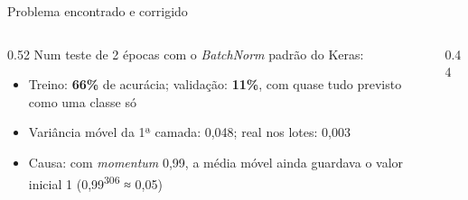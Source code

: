 \documentclass[aspectratio=169,10pt,t]{beamer}
\begin{document}
\begin{frame}{Problema encontrado e corrigido}
\begin{columns}[T]
\begin{column}{0.52\textwidth}
Num teste de 2 épocas com o \textit{BatchNorm} padrão do Keras:
\begin{itemize}
\item Treino: \textbf{66\%} de acurácia; validação: \textbf{11\%}, com quase tudo previsto como uma classe só
\item Variância móvel da 1ª camada: 0,048; real nos lotes: 0,003
\item Causa: com \textit{momentum} 0,99, a média móvel ainda guardava o valor inicial 1 (0,99\textsuperscript{306} ≈ 0,05)
\end{itemize}
\end{column}
\begin{column}{0.44\textwidth}
\vskip3mm
\end{column}
\end{columns}
\end{frame}
\end{document}
